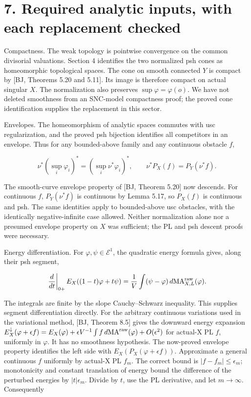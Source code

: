 \documentclass[11pt]{article}
\begin{document}
\section*{7. Required analytic inputs, with each replacement checked}
Compactness. The weak topology is pointwise convergence on the common divisorial valuations. Section 4 identifies the two normalized psh cones as homeomorphic topological spaces. The cone on smooth connected $Y$ is compact by [BJ, Theorems 5.20 and 5.11]. Its image is therefore compact on actual singular $X$. The normalization also preserves $\sup\varphi=\varphi(o)$. We have not deleted smoothness from an SNC-model compactness proof; the proved cone identification supplies the replacement in this sector.

Envelopes. The homeomorphism of analytic spaces commutes with usc regularization, and the proved psh bijection identifies all competitors in an envelope. Thus for any bounded-above family and any continuous obstacle $f$,

\[
 \nu^*(\sup_i\varphi_i)^*=(\sup_i\nu^*\varphi_i)^*,\qquad
 \nu^*P_X(f)=P_Y(\nu^*f).
\]

The smooth-curve envelope property of [BJ, Theorem 5.20] now descends. For continuous $f$, $P_Y(\nu^*f)$ is continuous by Lemma 5.17, so $P_X(f)$ is continuous and psh. The same identities apply to bounded-above usc obstacles, with the identically negative-infinite case allowed. Neither normalization alone nor a presumed envelope property on $X$ was sufficient; the PL and psh descent proofs were necessary.

Energy differentiation. For $\varphi,\psi\in\mathcal E^1$, the quadratic energy formula gives, along their psh segment,

\[
 \left.\frac{d}{dt}\right|_{0+}E_X((1-t)\varphi+t\psi)
 =\frac1V\int(\psi-\varphi)\,d\mathrm{MA}^{\rm raw}_{X,L}(\varphi).
\]

The integrals are finite by the slope Cauchy--Schwarz inequality. This supplies segment differentiation directly. For the arbitrary continuous variations used in the variational method, [BJ, Theorem 8.5] gives the downward energy expansion $E_X^\downarrow(\varphi+\epsilon f)=E_X(\varphi)+\epsilon V^{-1}\int f\,d\mathrm{MA}^{\rm raw}(\varphi)+O(\epsilon^2)$ for actual-X PL $f$, uniformly in $\varphi$. It has no smoothness hypothesis. The now-proved envelope property identifies the left side with $E_X(P_X(\varphi+\epsilon f))$. Approximate a general continuous $f$ uniformly by actual-X PL $f_m$. The correct bound is $|f-f_m|\leq\epsilon_m$; monotonicity and constant translation of energy bound the difference of the perturbed energies by $|t|\epsilon_m$. Divide by $t$, use the PL derivative, and let $m\to\infty$. Consequently
\end{document}
